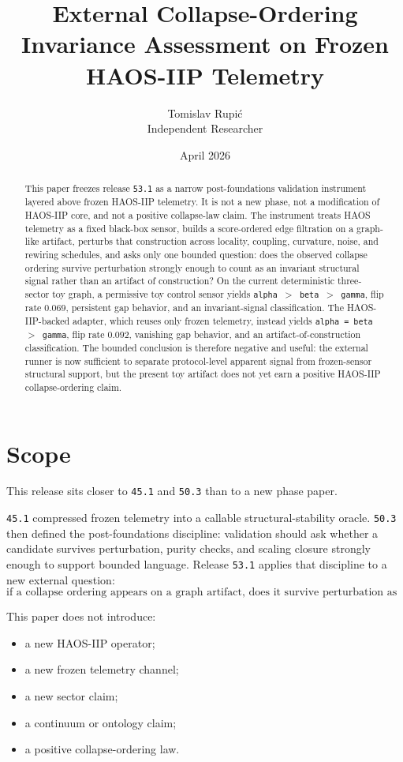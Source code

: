 \documentclass[11pt]{article}
\title{External Collapse-Ordering Invariance Assessment on Frozen HAOS-IIP Telemetry}
\author{Tomislav Rupi\'c \\ Independent Researcher}
\date{April 2026}
\begin{document}
\maketitle

\begin{abstract}
This paper freezes release \texttt{53.1} as a narrow post-foundations validation instrument layered above frozen HAOS-IIP telemetry. It is not a new phase, not a modification of HAOS-IIP core, and not a positive collapse-law claim. The instrument treats HAOS telemetry as a fixed black-box sensor, builds a score-ordered edge filtration on a graph-like artifact, perturbs that construction across locality, coupling, curvature, noise, and rewiring schedules, and asks only one bounded question: does the observed collapse ordering survive perturbation strongly enough to count as an invariant structural signal rather than an artifact of construction? On the current deterministic three-sector toy graph, a permissive toy control sensor yields \texttt{alpha $>$ beta $>$ gamma}, flip rate \(0.069\), persistent gap behavior, and an invariant-signal classification. The HAOS-IIP-backed adapter, which reuses only frozen telemetry, instead yields \texttt{alpha = beta $>$ gamma}, flip rate \(0.092\), vanishing gap behavior, and an artifact-of-construction classification. The bounded conclusion is therefore negative and useful: the external runner is now sufficient to separate protocol-level apparent signal from frozen-sensor structural support, but the present toy artifact does not yet earn a positive HAOS-IIP collapse-ordering claim.
\end{abstract}

\section{Scope}

This release sits closer to \texttt{45.1} and \texttt{50.3} than to a new phase paper.

\texttt{45.1} compressed frozen telemetry into a callable structural-stability oracle. \texttt{50.3} then defined the post-foundations discipline: validation should ask whether a candidate survives perturbation, purity checks, and scaling closure strongly enough to support bounded language. Release \texttt{53.1} applies that discipline to a new external question:
\[
\text{if a collapse ordering appears on a graph artifact, does it survive perturbation as structure?}
\]

This paper does not introduce:
\begin{itemize}
\item a new HAOS-IIP operator;
\item a new frozen telemetry channel;
\item a new sector claim;
\item a continuum or ontology claim;
\item a positive collapse-ordering law.
\end{itemize}
\end{document}
